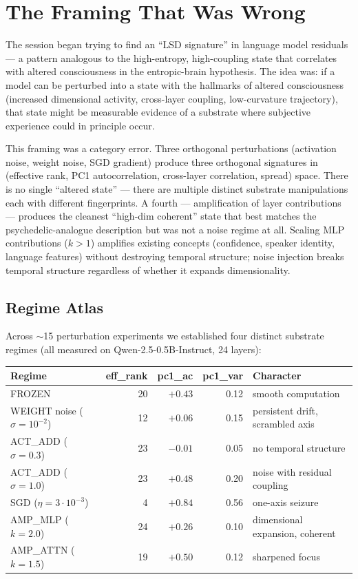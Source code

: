 \documentclass[11pt,a4paper]{article}
\begin{document}
\section{The Framing That Was Wrong}

The session began trying to find an ``LSD signature'' in language model residuals --- a pattern analogous to the high-entropy, high-coupling state that correlates with altered consciousness in the entropic-brain hypothesis. The idea was: if a model can be perturbed into a state with the hallmarks of altered consciousness (increased dimensional activity, cross-layer coupling, low-curvature trajectory), that state might be measurable evidence of a substrate where subjective experience could in principle occur.

This framing was a category error. Three orthogonal perturbations (activation noise, weight noise, SGD gradient) produce three orthogonal signatures in (effective rank, PC1 autocorrelation, cross-layer correlation, spread) space. There is no single ``altered state'' --- there are multiple distinct substrate manipulations each with different fingerprints. A fourth --- amplification of layer contributions --- produces the cleanest ``high-dim coherent'' state that best matches the psychedelic-analogue description but was not a noise regime at all. Scaling MLP contributions ($k > 1$) amplifies existing concepts (confidence, speaker identity, language features) without destroying temporal structure; noise injection breaks temporal structure regardless of whether it expands dimensionality.

\subsection{Regime Atlas}

Across $\sim$15 perturbation experiments we established four distinct substrate regimes (all measured on Qwen-2.5-0.5B-Instruct, 24 layers):

\begin{center}
\begin{tabular}{lrrrl}
\toprule
\textbf{Regime} & \textbf{eff\_rank} & \textbf{pc1\_ac} & \textbf{pc1\_var} & \textbf{Character} \\
\midrule
FROZEN & 20 & $+0.43$ & 0.12 & smooth computation \\
WEIGHT noise ($\sigma=10^{-2}$) & 12 & $+0.06$ & 0.15 & persistent drift, scrambled axis \\
ACT\_ADD ($\sigma=0.3$) & 23 & $-0.01$ & 0.05 & no temporal structure \\
ACT\_ADD ($\sigma=1.0$) & 23 & $+0.48$ & 0.20 & noise with residual coupling \\
SGD ($\eta=3 \cdot 10^{-3}$) & 4 & $+0.84$ & 0.56 & one-axis seizure \\
AMP\_MLP ($k=2.0$) & 24 & $+0.26$ & 0.10 & dimensional expansion, coherent \\
AMP\_ATTN ($k=1.5$) & 19 & $+0.50$ & 0.12 & sharpened focus \\
\bottomrule
\end{tabular}
\end{center}
\end{document}
